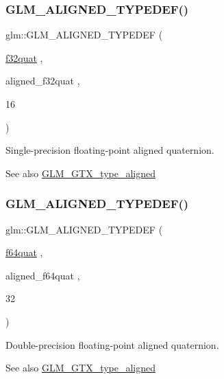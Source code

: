 \subsubsection{\texorpdfstring{G\+L\+M\+\_\+\+A\+L\+I\+G\+N\+E\+D\+\_\+\+T\+Y\+P\+E\+D\+E\+F()}{GLM\_ALIGNED\_TYPEDEF()}\hspace{0.1cm}{\footnotesize\ttfamily [208/209]}}
{\footnotesize\ttfamily glm\+::\+G\+L\+M\+\_\+\+A\+L\+I\+G\+N\+E\+D\+\_\+\+T\+Y\+P\+E\+D\+EF (\begin{DoxyParamCaption}\item[{\hyperlink{group__gtc__type__precision_gac59c4d798396552e4bbb866b3d8a2f18}{f32quat}}]{,  }\item[{aligned\+\_\+f32quat}]{,  }\item[{16}]{ }\end{DoxyParamCaption})}

Single-\/precision floating-\/point aligned quaternion. \begin{DoxySeeAlso}{See also}
\hyperlink{group__gtx__type__aligned}{G\+L\+M\+\_\+\+G\+T\+X\+\_\+type\+\_\+aligned} 
\end{DoxySeeAlso}
\mbox{\label{group__gtx__type__aligned_ga95cc03b8b475993fa50e05e38e203303}} 
\subsubsection{\texorpdfstring{G\+L\+M\+\_\+\+A\+L\+I\+G\+N\+E\+D\+\_\+\+T\+Y\+P\+E\+D\+E\+F()}{GLM\_ALIGNED\_TYPEDEF()}\hspace{0.1cm}{\footnotesize\ttfamily [209/209]}}
{\footnotesize\ttfamily glm\+::\+G\+L\+M\+\_\+\+A\+L\+I\+G\+N\+E\+D\+\_\+\+T\+Y\+P\+E\+D\+EF (\begin{DoxyParamCaption}\item[{\hyperlink{group__gtc__type__precision_ga5b54d7b36fbee5e271f73e6ed74e7172}{f64quat}}]{,  }\item[{aligned\+\_\+f64quat}]{,  }\item[{32}]{ }\end{DoxyParamCaption})}

Double-\/precision floating-\/point aligned quaternion. \begin{DoxySeeAlso}{See also}
\hyperlink{group__gtx__type__aligned}{G\+L\+M\+\_\+\+G\+T\+X\+\_\+type\+\_\+aligned} 
\end{DoxySeeAlso}
